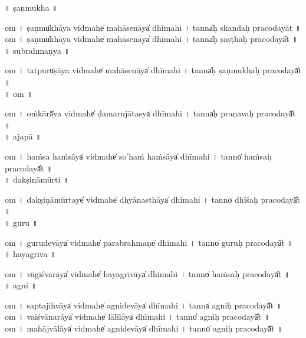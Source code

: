 \documentclass[parskip, DIV=14]{scrartcl}
\begin{document}
\vspace{0.201cm} ॥   ṣaṇmukha  ॥ \par
  om  । ṣaṇmu̍khāya vi॒dmahe̍ mahāse॒nāya̍ dhīmahi  ।  tanna̍ḥ skandaḥ pracodayāt ॥ \\
  om  । ṣaṇmu̍khāya vi॒dmahe̍ mahāse॒nāya̍ dhīmahi  ।  tanna̍ḥ ṣaṣṭhaḥ praco॒dayā̎t ॥ \\

\vspace{0.201cm} ॥   subrahmaṇya  ॥ \par
  om  । tatpuru̍ṣāya vi॒dmahe̍ mahāse॒nāya̍ dhīmahi  ।  tanna̍ḥ ṣaṇmukhaḥ praco॒dayā̎t ॥ \\

\vspace{0.201cm} ॥   om  ॥ \par
  om  । oṁkārā̍ya vi॒dmahe̍ ḍamarujā॒tasya̍ dhīmahi  ।  tanna̍ḥ praṇavaḥ praco॒dayā̎t ॥ \\

\vspace{0.201cm} ॥   ajapā  ॥ \par
  om  । ha॒ṁsa॒ ha॒ṁsāya̍ vi॒dmahe̍ so'haṁ ha॒ṁsāya̍ dhīmahi  ।  tanno̍ haṁsaḥ praco॒dayā̎t ॥ \\

\vspace{0.201cm} ॥   dakṣiṇāmūrti  ॥ \par
  om  । da॒kṣi॒ṇā॒mū॒rtaye̍ vi॒dmahe̍ dhyāna॒sthāya̍ dhīmahi  ।  tanno̍ dhīśaḥ praco॒dayā̎t ॥ \\

\vspace{0.201cm} ॥   guru  ॥ \par
  om  । gu॒ru॒de॒vāya̍ vi॒dmahe̍ parabra॒hmaṇe̍ dhīmahi  ।  tanno̍ guruḥ praco॒dayā̎t ॥ \\

\vspace{0.201cm} ॥   hayagrīva  ॥ \par
  om  । vā॒gī॒śva॒rāya̍ vi॒dmahe̍ hayagrī॒vāya̍ dhīmahi  ।  tanno̍ haṁsaḥ praco॒dayā̎t ॥ \\

\vspace{0.201cm} ॥   agni  ॥ \par
  om  । sa॒pta॒ji॒hvāya̍ vi॒dmahe̍ agnide॒vāya̍ dhīmahi  ।  tanna̍ agniḥ praco॒dayā̎t ॥ \\
  om  । vai॒śvā॒na॒rāya̍ vi॒dmahe̍ lālī॒lāya̍ dhīmahi  ।  tanno̍ agniḥ praco॒dayā̎t ॥ \\
  om  । mahājvālāya̍ vi॒dmahe̍ agnide॒vāya̍ dhīmahi  ।  tanno̍ agniḥ praco॒dayā̎t ॥ \\
\end{document}
